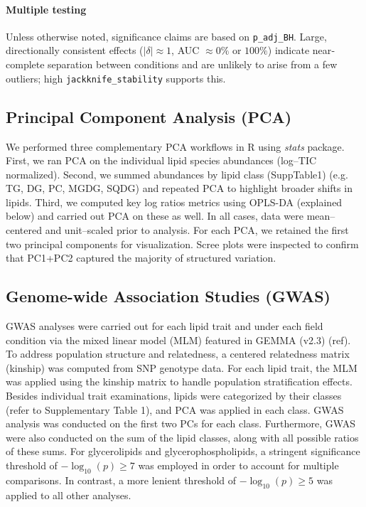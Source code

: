 \documentclass[10pt,letterpaper]{article}
\begin{document}
\paragraph{Multiple testing}
Unless otherwise noted, significance claims are based on \texttt{p\_adj\_BH}.  
Large, directionally consistent effects ($|\delta| \approx 1$, AUC $\approx 0\%$ or $100\%$) indicate near‐complete separation between conditions and are unlikely to arise from a few outliers; high \texttt{jackknife\_stability} supports this.



\subsection*{Principal Component Analysis (PCA)}  
We performed three complementary PCA workflows in R using \emph{stats} package.  First, we ran PCA on the individual lipid species abundances (log–TIC normalized).  Second, we summed abundances by lipid class (SuppTable1) (e.g. TG, DG, PC, MGDG, SQDG) and repeated PCA to highlight broader shifts in lipids. Third, we computed key log ratios metrics using OPLS-DA (explained below) and carried out PCA on these as well. In all cases, data were mean–centered and unit–scaled prior to analysis. For each PCA, we retained the first two principal components for visualization. Scree plots were inspected to confirm that PC1+PC2 captured the majority of structured variation.


\subsection*{Genome-wide Association Studies (GWAS)} 
GWAS analyses were carried out for each lipid trait and under each field condition via the mixed linear model (MLM) featured in GEMMA (v2.3) (ref). To address population structure and relatedness, a centered relatedness matrix (kinship) was computed from SNP genotype data. For each lipid trait, the MLM was applied using the kinship matrix to handle population stratification effects. Besides individual trait examinations, lipids were categorized by their classes (refer to Supplementary Table 1), and PCA was applied in each class. GWAS analysis was conducted on the first two PCs for each class. Furthermore, GWAS were also conducted on the sum of the lipid classes, along with all possible ratios of these sums. For glycerolipids and glycerophospholipids, a stringent significance threshold of \(-\log_{10}(p) \geq 7\) was employed in order to account for multiple comparisons. In contrast, a more lenient threshold of \(-\log_{10}(p) \geq 5\) was applied to all other analyses.
\end{document}
